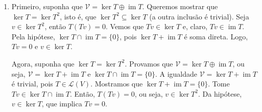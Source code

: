 \documentclass{article}
\DeclareMathOperator{\im}{im}
\begin{document}
\begin{enumerate}
    \item[\textbf{E11}] Primeiro, suponha que \(\mathcal{V} = \ker T \oplus \im T\). Queremos mostrar que \(\ker T = \ker T^2\), isto é, que \(\ker T^2 \subseteq \ker T\) (a outra inclusão é trivial). Seja \(v \in \ker T^2\), então \(T(Tv)=0\). 
    Vemos que \(Tv \in \ker T\) e, claro, \(Tv \in \im T\). Pela hipótese, \(\ker T \cap \im T = \{0\}\), pois \(\ker T + \im T\) é soma direta. Logo, \(Tv=0\) e \(v \in \ker T\).
    
    Agora, suponha que \(\ker T=\ker T^2\). Provamos que \(\mathcal{V} = \ker T \oplus \im T\), ou seja, \(\mathcal{V} = \ker T + \im T\) e \(\ker T \cap \im T = \{0\}\). A igualdade \(\mathcal{V} = \ker T + \im T\) é trivial, pois \(T \in \mathcal{L}(V)\).
    Mostramos que \(\ker T + \im T = \{0\}\). Tome \(Tv \in \ker T \cap \im T\). Então, \(T(Tv) = 0\), ou seja, \(v \in \ker T^2\). Da hipótese, \(v \in \ker T\), que implica \(Tv = 0\).


\end{enumerate}
\end{document}
